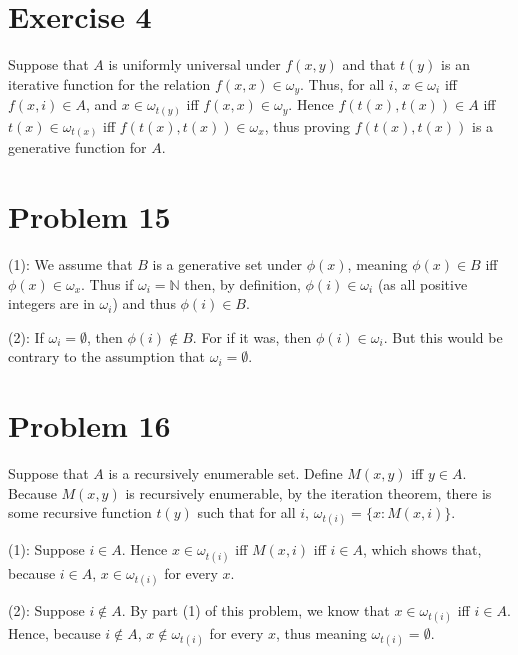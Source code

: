 \documentclass{article}
\newcommand{\N}{\mathbb{N}}
\theoremstyle{definition}
\begin{document}
\section*{Exercise 4}
Suppose that $A$ is uniformly universal under $f(x,y)$ and that $t(y)$ is an iterative function for the relation $f(x,x)\in\omega_y$. Thus, for all $i$, $x\in\omega_i$ iff $f(x,i)\in A$, 
and $x\in\omega_{t(y)}$ iff $f(x,x)\in\omega_y$. Hence $f(t(x),t(x))\in A$ iff $t(x)\in\omega_{t(x)}$ iff $f(t(x),t(x))\in\omega_x$, thus proving $f(t(x),t(x))$ is a generative function for 
$A$.

\section*{Problem 15}
(1): We assume that $B$ is a generative set under $\phi(x)$, meaning $\phi(x)\in B$ iff $\phi(x)\in\omega_x$. Thus if $\omega_i=\N$ then, by definition, $\phi(i)\in\omega_i$ (as all 
positive integers are in $\omega_i$) and thus $\phi(i)\in B$.


(2): If $\omega_i=\emptyset$, then $\phi(i)\notin B$. For if it was, then $\phi(i)\in\omega_i$. But this would be contrary to the assumption that $\omega_i=\emptyset$.

\section*{Problem 16}
Suppose that $A$ is a recursively enumerable set. Define $M(x,y)$ iff $y\in A$. Because $M(x,y)$ is recursively enumerable, by the iteration theorem, there is some recursive function 
$t(y)$ such that for all $i$, $\omega_{t(i)}=\{x:M(x,i)\}$. 


(1): Suppose $i\in A$. Hence $x\in\omega_{t(i)}$ iff $M(x,i)$ iff $i\in A$, which shows that, because $i\in A$, $x\in\omega_{t(i)}$ for every $x$.


(2): Suppose $i\notin A$. By part (1) of this problem, we know that $x\in\omega_{t(i)}$ iff $i\in A$. Hence, because $i\notin A$, $x\notin\omega_{t(i)}$ for every $x$, thus meaning 
$\omega_{t(i)}=\emptyset$.
\end{document}
